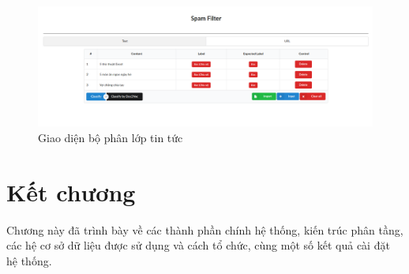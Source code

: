 \begin{figure}[H]
		\centering
	\includegraphics[width=0.96\linewidth]{Chapter3/Chapter3Figs/Filter.png}
	\caption{Giao diện bộ phân lớp tin tức}
	\label{fig:startclustering}
\end{figure}

\section{Kết chương}
Chương này đã trình bày về các thành phần chính hệ thống, kiến trúc phân tầng, các hệ cơ sở dữ liệu được sử dụng và cách tổ chức, cùng một số kết quả cài đặt hệ thống.